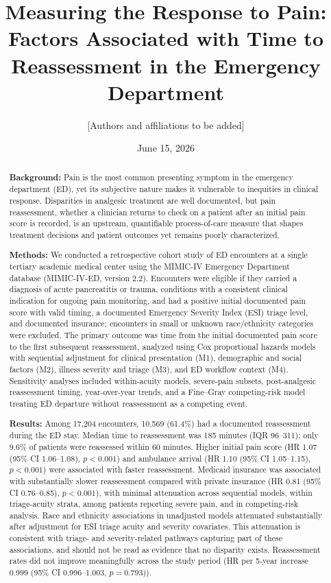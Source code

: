 \documentclass[11pt]{article}
\title{Measuring the Response to Pain: Factors Associated with Time to Reassessment in the Emergency Department}
\author{[Authors and affiliations to be added]}
\date{June 15, 2026}
\newcommand{\CohortN}{17,204}
\newcommand{\CohortEvents}{10,569}
\newcommand{\HRPainMfour}{1.07 (95\% CI 1.06--1.08), $p<0.001$}
\newcommand{\HRAmbulanceMfour}{1.10 (95\% CI 1.05--1.15), $p<0.001$}
\newcommand{\HRMedicaidMfour}{0.81 (95\% CI 0.76--0.85), $p<0.001$}
\newcommand{\HRYearFive}{0.999 (95\% CI 0.996--1.003, $p=0.793$)}
\begin{document}
\maketitle

\begin{abstract}
\textbf{Background:}
Pain is the most common presenting symptom in the emergency department (ED), yet its subjective nature makes it vulnerable to inequities in clinical response.
Disparities in analgesic treatment are well documented, but pain reassessment, whether a clinician returns to check on a patient after an initial pain score is recorded, is an upstream, quantifiable process-of-care measure that shapes treatment decisions and patient outcomes yet remains poorly characterized.

\textbf{Methods:}
We conducted a retrospective cohort study of ED encounters at a single tertiary academic medical center using the MIMIC-IV Emergency Department database (MIMIC-IV-ED, version 2.2).
Encounters were eligible if they carried a diagnosis of acute pancreatitis or trauma, conditions with a consistent clinical indication for ongoing pain monitoring, and had a positive initial documented pain score with valid timing, a documented Emergency Severity Index (ESI) triage level, and documented insurance; encounters in small or unknown race/ethnicity categories were excluded.
The primary outcome was time from the initial documented pain score to the first subsequent reassessment, analyzed using Cox proportional hazards models with sequential adjustment for clinical presentation (M1), demographic and social factors (M2), illness severity and triage (M3), and ED workflow context (M4).
Sensitivity analyses included within-acuity models, severe-pain subsets, post-analgesic reassessment timing, year-over-year trends, and a Fine--Gray competing-risk model treating ED departure without reassessment as a competing event.

\textbf{Results:}
Among \CohortN{} encounters, \CohortEvents{} (61.4\%) had a documented reassessment during the ED stay.
Median time to reassessment was 185 minutes (IQR 96--311); only 9.6\% of patients were reassessed within 60 minutes.
Higher initial pain score (HR \HRPainMfour{}) and ambulance arrival (HR \HRAmbulanceMfour{}) were associated with faster reassessment.
Medicaid insurance was associated with substantially slower reassessment compared with private insurance (HR \HRMedicaidMfour{}), with minimal attenuation across sequential models, within triage-acuity strata, among patients reporting severe pain, and in competing-risk analysis.
Race and ethnicity associations in unadjusted models attenuated substantially after adjustment for ESI triage acuity and severity covariates.
This attenuation is consistent with triage- and severity-related pathways capturing part of these associations, and should not be read as evidence that no disparity exists.
Reassessment rates did not improve meaningfully across the study period (HR per 5-year increase \HRYearFive{}).


\end{abstract}
\end{document}
